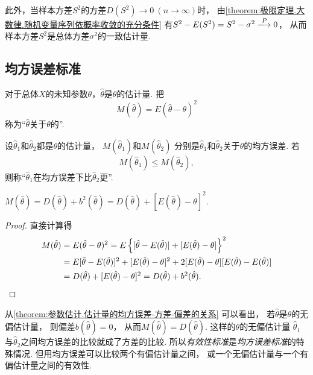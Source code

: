 此外，当样本方差\(S^2\)的方差\(D(S^2) \to 0\ (n\to\infty)\)时，
由\cref{theorem:极限定理.大数律.随机变量序列依概率收敛的充分条件}
有\(S^2 - E(S^2) = S^2 - \sigma^2 \toP 0\)，
从而样本方差\(S^2\)是总体方差\(\sigma^2\)的一致估计量.

\subsection{均方误差标准}
\begin{definition}
对于总体\(X\)的未知参数\(\theta\)，\(\hat{\theta}\)是\(\theta\)的估计量.
把\[
	M(\hat{\theta}) = E(\hat{\theta} - \theta)^2
\]称为“\(\hat{\theta}\)关于\(\theta\)的”.
\end{definition}

\begin{definition}
设\(\hat{\theta}_1\)和\(\hat{\theta}_2\)都是\(\theta\)的估计量，
\(M(\hat{\theta}_1)\)和\(M(\hat{\theta}_2)\)
分别是\(\hat{\theta}_1\)和\(\hat{\theta}_2\)关于\(\theta\)的均方误差.
若\[
	M(\hat{\theta}_1) \leq M(\hat{\theta}_2),
\]
则称“\(\hat{\theta}_1\)在均方误差下比\(\hat{\theta}_2\)更”.
\end{definition}

\begin{theorem}\label{theorem:参数估计.估计量的均方误差-方差-偏差的关系}
\(M(\hat{\theta}) = D(\hat{\theta}) + b^2(\hat{\theta})
= D(\hat{\theta}) + [E(\hat{\theta}) - \theta]^2.\)
\begin{proof}
直接计算得\begin{align*}
	M(\hat{\theta})
	&= E(\hat{\theta} - \theta)^2
	= E\left\{
		[\hat{\theta} - E(\hat{\theta})]
		+ [E(\hat{\theta}) - \theta]
	\right\}^2 \\
	&= E[\hat{\theta} - E(\hat{\theta})]^2
	+ [E(\hat{\theta}) - \theta]^2
	+ 2[E(\hat{\theta}) - \theta][E(\hat{\theta}) - E(\hat{\theta})] \\
	&= D(\hat{\theta}) + [E(\hat{\theta}) - \theta]^2
	= D(\hat{\theta}) + b^2(\hat{\theta}).
	\qedhere
\end{align*}
\end{proof}
\end{theorem}
从\cref{theorem:参数估计.估计量的均方误差-方差-偏差的关系} 可以看出，
若\(\hat{\theta}\)是\(\theta\)的无偏估计量，
则偏差\(b(\hat{\theta})=0\)，
从而\(M(\hat{\theta})=D(\hat{\theta})\).
这样的\(\theta\)的无偏估计量
\(\hat{\theta}_1\)与\(\hat{\theta}_2\)之间均方误差的比较就成了方差的比较.
所以\emph{有效性标准}是\emph{均方误差标准}的特殊情况.
但用均方误差可以比较两个有偏估计量之间，
或一个无偏估计量与一个有偏估计量之间的有效性.

